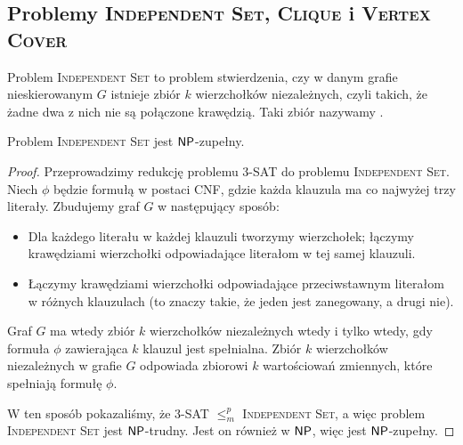 \subsection{Problemy \textsc{Independent Set}, \textsc{Clique} i \textsc{Vertex Cover}}

Problem \textsc{Independent Set} to problem stwierdzenia, czy w danym grafie nieskierowanym $G$ istnieje zbiór $k$ wierzchołków niezależnych, czyli takich, że żadne dwa z nich nie są połączone krawędzią. Taki zbiór nazywamy .

\begin{theorem}\label{t:Independent Set}
    Problem \textsc{Independent Set} jest $\textsf{NP}$-zupełny.
\end{theorem}
\begin{proof}
    Przeprowadzimy redukcję problemu 3-SAT do problemu \textsc{Independent Set}. Niech $\phi$ będzie formułą w postaci CNF, gdzie każda klauzula ma co najwyżej trzy literały. Zbudujemy graf $G$ w następujący sposób:
    \begin{itemize}
        \item Dla każdego literału w każdej klauzuli tworzymy wierzchołek; łączymy krawędziami wierzchołki odpowiadające literałom w tej samej klauzuli.
        \item Łączymy krawędziami wierzchołki odpowiadające przeciwstawnym literałom w różnych klauzulach (to znaczy takie, że jeden jest zanegowany, a drugi nie).
    \end{itemize}
    Graf $G$ ma wtedy zbiór $k$ wierzchołków niezależnych wtedy i tylko wtedy, gdy formuła $\phi$ zawierająca $k$ klauzul jest spełnialna. Zbiór $k$ wierzchołków niezależnych w grafie $G$ odpowiada zbiorowi $k$ wartościowań zmiennych, które spełniają formułę $\phi$.

    W ten sposób pokazaliśmy, że 3-SAT $\leq_m^p$ \textsc{Independent Set}, a więc problem \textsc{Independent Set} jest $\textsf{NP}$-trudny. Jest on również w $\textsf{NP}$, więc jest $\textsf{NP}$-zupełny.
\end{proof}

